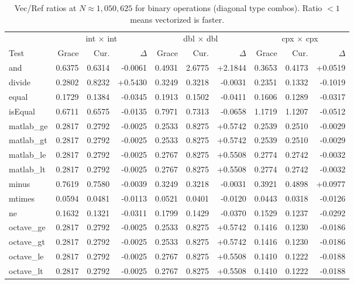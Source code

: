 \begin{table}[H]
\centering
\caption{Vec/Ref ratios at $N \approx 1{,}050{,}625$ for binary operations (diagonal type combos). Ratio $< 1$ means vectorized is faster.}
\label{tab:ratio-binary-diag}
\small
\begin{tabular}{l | r r r | r r r | r r r}
\toprule
 & \multicolumn{3}{c|}{int $\times$ int} & \multicolumn{3}{c|}{dbl $\times$ dbl} & \multicolumn{3}{c}{cpx $\times$ cpx} \\
Test & Grace & Cur. & $\Delta$ & Grace & Cur. & $\Delta$ & Grace & Cur. & $\Delta$ \\
\midrule
  and & 0.6375 & 0.6314 & -0.0061 & 0.4931 & 2.6775 & +2.1844 & 0.3653 & 0.4173 & +0.0519 \\
  divide & 0.2802 & 0.8232 & +0.5430 & 0.3249 & 0.3218 & -0.0031 & 0.2351 & 0.1332 & -0.1019 \\
  equal & 0.1729 & 0.1384 & -0.0345 & 0.1913 & 0.1502 & -0.0411 & 0.1606 & 0.1289 & -0.0317 \\
  isEqual & 0.6711 & 0.6575 & -0.0135 & 0.7971 & 0.7313 & -0.0658 & 1.1719 & 1.1207 & -0.0512 \\
  matlab\_ge & 0.2817 & 0.2792 & -0.0025 & 0.2533 & 0.8275 & +0.5742 & 0.2539 & 0.2510 & -0.0029 \\
  matlab\_gt & 0.2817 & 0.2792 & -0.0025 & 0.2533 & 0.8275 & +0.5742 & 0.2539 & 0.2510 & -0.0029 \\
  matlab\_le & 0.2817 & 0.2792 & -0.0025 & 0.2767 & 0.8275 & +0.5508 & 0.2774 & 0.2742 & -0.0032 \\
  matlab\_lt & 0.2817 & 0.2792 & -0.0025 & 0.2767 & 0.8275 & +0.5508 & 0.2774 & 0.2742 & -0.0032 \\
  minus & 0.7619 & 0.7580 & -0.0039 & 0.3249 & 0.3218 & -0.0031 & 0.3921 & 0.4898 & +0.0977 \\
  mtimes & 0.0594 & 0.0481 & -0.0113 & 0.0521 & 0.0401 & -0.0120 & 0.0443 & 0.0318 & -0.0126 \\
  ne & 0.1632 & 0.1321 & -0.0311 & 0.1799 & 0.1429 & -0.0370 & 0.1529 & 0.1237 & -0.0292 \\
  octave\_ge & 0.2817 & 0.2792 & -0.0025 & 0.2533 & 0.8275 & +0.5742 & 0.1416 & 0.1230 & -0.0186 \\
  octave\_gt & 0.2817 & 0.2792 & -0.0025 & 0.2533 & 0.8275 & +0.5742 & 0.1416 & 0.1230 & -0.0186 \\
  octave\_le & 0.2817 & 0.2792 & -0.0025 & 0.2767 & 0.8275 & +0.5508 & 0.1410 & 0.1222 & -0.0188 \\
  octave\_lt & 0.2817 & 0.2792 & -0.0025 & 0.2767 & 0.8275 & +0.5508 & 0.1410 & 0.1222 & -0.0188 \\

\end{tabular}
\end{table}

